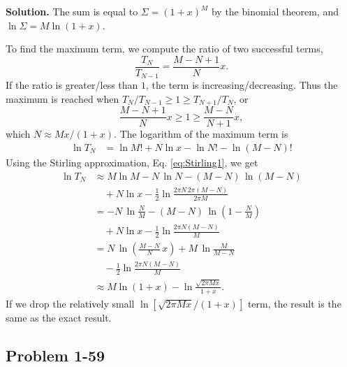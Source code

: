 \documentclass[twocolumn, 10pt]{article}
\numberwithin{equation}{section}
\newenvironment{solution}
{\par\medskip
  \textbf{Solution. }\ignorespaces}
{\medskip}
\begin{document}
\begin{solution}
The sum is equal to $\Sigma = (1+x)^M$ by the binomial theorem,
and $\ln \Sigma = M \ln(1+x)$.

To find the maximum term,
we compute the ratio of two successful terms,
$$
  \frac{ T_N } { T_{N - 1} }
  =
  \frac{ M - N + 1 } { N } x.
$$
If the ratio is greater/less than $1$,
the term is increasing/decreasing.
Thus the maximum is reached when
  $T_N/T_{N-1} \ge 1 \ge T_{N+1}/T_N$, or
$$
  \frac{ M - N + 1} { N } x
  \ge 1 \ge
  \frac{ M - N } { N + 1 } x,
$$
which $N \approx M x /(1+x)$.
The logarithm of the maximum term is
\begin{align*}
  \ln T_N
  &= \ln M! + N \ln x - \ln N! - \ln (M-N)!
\end{align*}
%
Using the Stirling approximation, Eq. \eqref{eq:Stirling1},
we get
\begin{align*}
  \ln T_N
  &\approx M \ln M - N \, \ln N - (M - N) \, \ln(M-N) \\
  &\quad + N \ln x
  -\frac{1}{2} \ln\frac{2\pi N \, 2\pi(M-N)}{2\pi M}
  \\
  &=- N \, \ln \frac{N}{M} - (M - N) \, \ln\left(1-\frac{N}{M}\right) \\
  &\quad + N \ln x
  -\frac{1}{2} \ln\frac{2\pi N (M-N)}{M}
  \\
  &=
  N \, \ln\left( \frac{M-N}{N} \, x \right)
  + M \, \ln \frac{M}{M-N}
  \\
  &\quad -\frac{1}{2} \ln\frac{2\pi N (M-N)}{M}
  \\
  &\approx
  M\ln(1+x) - \ln\frac{ \sqrt{2\pi M x} } { 1 + x}
  .
\end{align*}
If we drop the relatively small
$\ln[\sqrt{2\pi M x}/(1 + x)]$ term,
the result is the same as the exact result.
\end{solution}



\subsection{Problem 1-59}
\end{document}
